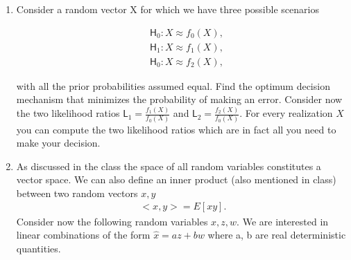\documentclass[letter, 12pt]{article}
\begin{document}
\begin{enumerate}[wide = 0pt, label = \textbf{Problem \arabic*:}]
		\item {Consider a random vector X for which we have three possible scenarios
		\begin{fleqn}[1cm]
			\begin{align*}
			&\mathsf{H}_0 : X \approx f_0 (X),\\
			&\mathsf{H}_1 : X \approx f_1 (X),\\
			&\mathsf{H}_0 : X \approx f_2 (X),
			\end{align*}
		\end{fleqn}
		with all the prior probabilities assumed equal. Find the optimum decision mechanism that minimizes the probability of making an error. Consider now the two likelihood ratios $ \mathsf{L}_1 = \frac{f_1(X)}{f_0(X)} $ and $ \mathsf{L}_2 = \frac{f_2(X)}{f_0(X)} $. For every realization $ X $ you can compute the two likelihood ratios which are in fact all you need to make your
		decision. }
	
		\item {As discussed in the class the space of all random variables constitutes a vector space. We can also define an inner product (also mentioned in class) between two random vectors $ x, y $ 
			\begin{align*}
				<x, y>= E[xy].
			\end{align*} Consider now the following random variables $ x, z, w $. We are interested in linear combinations of the form $ \hat{x}= az + bw $ where a, b are real deterministic quantities.}
	\end{enumerate}
\end{document}
